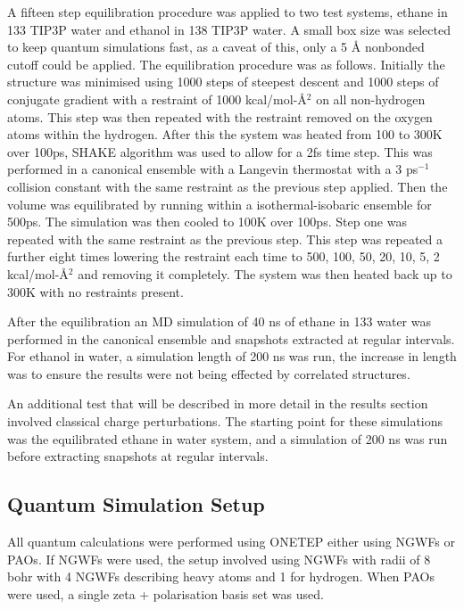 
A fifteen step equilibration procedure was applied to two test systems, ethane in 133 TIP3P water and ethanol in 138 TIP3P water.  A small box size was selected to keep quantum simulations fast, as a caveat of this, only a 5 \AA{} nonbonded cutoff could be applied.  The equilibration procedure was as follows.  Initially the structure was minimised using 1000 steps of steepest descent and 1000 steps of conjugate gradient with a restraint of 1000 kcal/mol-\AA{}$^2$ on all non-hydrogen atoms.  This step was then repeated with the restraint removed on the oxygen atoms within the hydrogen.  After this the system was heated from 100 to 300K over 100ps, SHAKE \cite{shake} algorithm was used to allow for a 2fs time step.  This was performed in a canonical ensemble with a Langevin thermostat with a 3 ps$^{-1}$ collision constant with the same restraint as the previous step applied.  Then the volume was equilibrated by running within a isothermal-isobaric ensemble for 500ps.  The simulation was then cooled to 100K over 100ps.  Step one was repeated with the same restraint as the previous step.  This step was repeated a further eight times lowering the restraint each time to 500, 100, 50, 20, 10, 5, 2 kcal/mol-\AA{}$^2$ and removing it completely.  The system was then heated back up to 300K with no restraints present.


After the equilibration an MD simulation of 40 ns of ethane in 133 water was performed in the canonical ensemble and snapshots extracted at regular intervals.  For ethanol in water, a simulation length of 200 ns was run, the increase in length was to ensure the results were not being effected by correlated structures.

An additional test that will be described in more detail in the results section involved classical charge perturbations.  The starting point for these simulations was the equilibrated ethane in water system, and a simulation of 200 ns was run before extracting snapshots at regular intervals.

\subsection{Quantum Simulation Setup}

All quantum calculations were performed using ONETEP \cite{ONETEP} either using NGWFs or PAOs.  If NGWFs were used, the setup involved using NGWFs with radii of 8 bohr with 4 NGWFs describing heavy atoms and 1 for hydrogen.  When PAOs were used, a single zeta + polarisation basis set was used.

